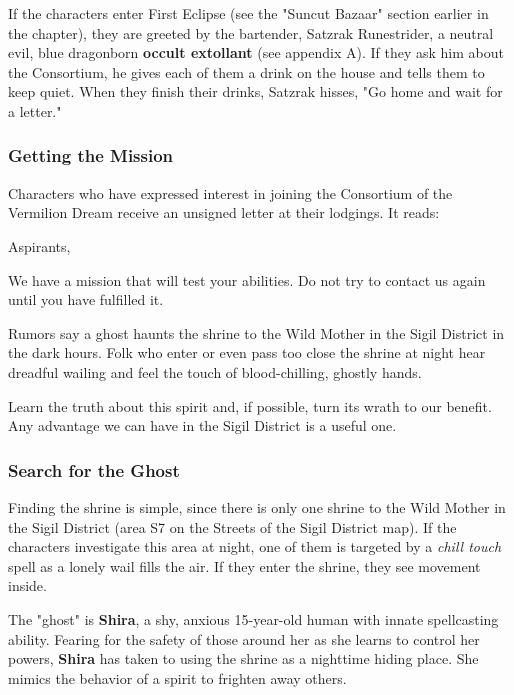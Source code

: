 \documentclass[10pt,a4paper,twoside,bg=print,twocolumn,openany,nodeprecatedcode]{dndbook}
\begin{document}
If the characters enter First Eclipse (see the "Suncut Bazaar" section earlier in the chapter), they are greeted by the bartender, Satzrak Runestrider, a neutral evil, blue dragonborn \textbf{occult extollant} (see appendix A). If they ask him about the Consortium, he gives each of them a drink on the house and tells them to keep quiet. When they finish their drinks, Satzrak hisses, "Go home and wait for a letter."

\subsubsection{Getting the Mission}
Characters who have expressed interest in joining the Consortium of the Vermilion Dream receive an unsigned letter at their lodgings. It reads:

\begin{DndReadAloud}{}
Aspirants,

We have a mission that will test your abilities. Do not try to contact us again until you have fulfilled it.

Rumors say a ghost haunts the shrine to the Wild Mother in the Sigil District in the dark hours. Folk who enter or even pass too close the shrine at night hear dreadful wailing and feel the touch of blood-chilling, ghostly hands.

Learn the truth about this spirit and, if possible, turn its wrath to our benefit. Any advantage we can have in the Sigil District is a useful one.

\end{DndReadAloud}

\subsubsection{Search for the Ghost}
Finding the shrine is simple, since there is only one shrine to the Wild Mother in the Sigil District (area S7 on the Streets of the Sigil District map). If the characters investigate this area at night, one of them is targeted by a \textit{chill touch} spell as a lonely wail fills the air. If they enter the shrine, they see movement inside.

The "ghost" is \textbf{Shira}, a shy, anxious 15-year-old human with innate spellcasting ability. Fearing for the safety of those around her as she learns to control her powers, \textbf{Shira} has taken to using the shrine as a nighttime hiding place. She mimics the behavior of a spirit to frighten away others.
\end{document}
